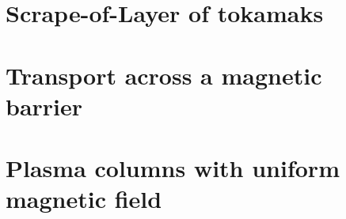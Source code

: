 	\section{Scrape-of-Layer of tokamaks}
	\section{Transport across a magnetic barrier}
	\section{Plasma columns with uniform magnetic field}
	